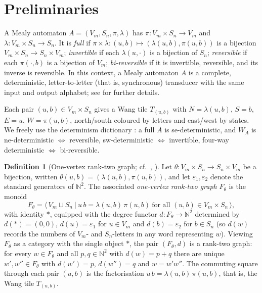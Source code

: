 \documentclass[11pt,reqno]{amsart}
\theoremstyle{plain}
\theoremstyle{definition}
\newtheorem{definition}[theorem]{Definition}
\newcommand{\NN}{\mathbb{N}}
\newcommand{\Vm}{V_m}
\newcommand{\Sn}{S_n}
\newcommand{\eps}{\varepsilon}
\begin{document}
\section{Preliminaries}\label{sec:prelim}

A Mealy automaton $A=(\Vm,\Sn,\pi,\lambda)$ has $\pi\colon\Vm\times\Sn\to\Vm$ and
$\lambda\colon\Vm\times\Sn\to\Sn$. It is \emph{full} if
$\pi\times\lambda\colon(u,b)\mapsto(\lambda(u,b),\pi(u,b))$ is a bijection
$\Vm\times\Sn\to\Sn\times\Vm$; \emph{invertible} if each $\lambda(u,\cdot)$ is a
bijection of $\Sn$; \emph{reversible} if each $\pi(\cdot,b)$ is a bijection of
$\Vm$; \emph{bi-reversible} if it is invertible, reversible, and its inverse is
reversible. 
In this context, a Mealy automaton $A$ is a complete, deterministic,
letter-to-letter (that is, synchronous) transducer with the same input and output
alphabet; see \cite{KlPi,GNS} for further details.

Each pair $(u,b) \in V_m \times S_n$ gives a Wang tile $T_{(u,b)}$ with
$N=\lambda(u,b)$, $S=b$, $E=u$, $W=\pi(u,b)$, north/south coloured by letters and
east/west by states. We freely use the determinism dictionary
\cite{GM}: a full $A$ is se-deterministic, and $W_A$ is
ne-deterministic $\iff$ reversible, sw-deterministic $\iff$ invertible, four-way
deterministic $\iff$ bi-reversible.

\begin{definition}[One-vertex rank-two graph; cf.\ \cite{Y},
\cite{KP}]\label{def:Ftheta}
Let $\theta\colon\Vm\times\Sn\to\Sn\times\Vm$ be a bijection, written
$\theta(u,b)=(\lambda(u,b),\pi(u,b))$, and let $\eps_1,\eps_2$ denote the standard
generators of $\NN^2$. The associated \emph{one-vertex rank-two graph} $F_\theta$ is
the monoid
\[
F_\theta=\big\langle\, \Vm\sqcup\Sn \ \big|\ u\,b=\lambda(u,b)\,\pi(u,b)
\ \text{for all } (u,b)\in\Vm\times\Sn \,\big\rangle,
\]
with identity $\ast$, equipped with the degree functor $d\colon F_\theta\to\NN^2$
determined by $d(\ast)=(0,0)$, $d(u)=\eps_1$ for $u\in\Vm$ and $d(b)=\eps_2$ for
$b\in\Sn$ (so $d(w)$ records the numbers of $\Vm$- and $\Sn$-letters in any word
representing $w$). Viewing $F_\theta$ as a category with the single object $\ast$,
the pair $(F_\theta,d)$ is a rank-two graph: for every $w\in F_\theta$ and all
$p,q\in\NN^2$ with $d(w)=p+q$ there are unique $w',w''\in F_\theta$ with $d(w')=p$,
$d(w'')=q$ and $w=w'w''$. The commuting square through each pair $(u,b)$ is the
factorisation $u\,b=\lambda(u,b)\,\pi(u,b)$, that is, the Wang tile $T_{(u,b)}$.
\end{definition}
\end{document}
